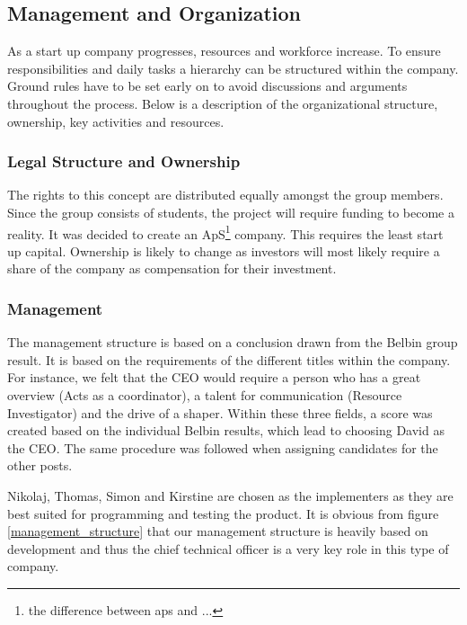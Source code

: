 \subsection{Management and Organization}
\label{sec:managementOrganization}
As a start up company progresses, resources and workforce increase. To ensure responsibilities and daily tasks a hierarchy can be structured within the company. Ground rules have to be set early on to avoid discussions and arguments throughout the process. Below is a description of the organizational structure, ownership, key activities and resources.

\subsubsection{Legal Structure and Ownership}
The rights to this concept are distributed equally amongst the group members. 
Since the group consists of students, the project will require funding to become a reality.  
It was decided to create an ApS\footnote{the difference between aps and ...}  company.
This requires the least start up capital. 
Ownership is likely to change as investors will most likely require a share of the company as compensation for their investment.

\subsubsection{Management}
The management structure is based on a conclusion drawn from the Belbin group result. It is based on the requirements of the different titles within the company. 
For instance, we felt that the CEO would require a person who has a great overview (Acts as a coordinator), a talent for communication (Resource Investigator) and the drive of a shaper. Within these three fields, a score was created based on the individual Belbin results, which lead to choosing David as the CEO. 
The same procedure was followed when assigning candidates for the other posts. 

Nikolaj, Thomas, Simon and Kirstine are chosen as the implementers as they are best suited for programming and testing the product.
It is obvious from figure \ref{management_structure} that our management structure is heavily based on development and thus the chief technical officer is a very key role in this type of company.

